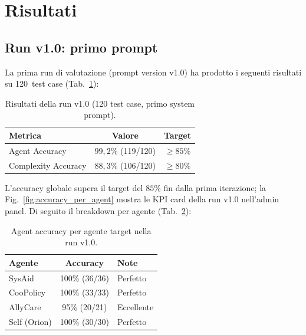 \section{Risultati}
\label{sec:eval-risultati}

\subsection{Run v1.0: primo prompt}
\label{subsec:eval-v10}

La prima run di valutazione (prompt version v1.0) ha prodotto i seguenti risultati su 120~test case (Tab.~\ref{tab:eval-v10}):

\begin{table}[htbp]
  \centering
  \caption[Risultati della run v1.0]{Risultati della run v1.0 (120 test case, primo system prompt).}
  \label{tab:eval-v10}
  \begin{tabular}{lcc}
    \toprule
    \textbf{Metrica}             & \textbf{Valore}  & \textbf{Target} \\
    \midrule
    Agent Accuracy               & $99{,}2\%$ (119/120) & $\geq 85\%$ \\
    Complexity Accuracy          & $88{,}3\%$ (106/120) & $\geq 80\%$ \\
    \bottomrule
  \end{tabular}
\end{table}

L'accuracy globale supera il target del $85\%$ fin dalla prima iterazione; la Fig.~\ref{fig:accuracy_per_agent} mostra le KPI card della run v1.0 nell'admin panel. Di seguito il breakdown per agente (Tab.~\ref{tab:eval-v10-breakdown}):

\begin{table}[htbp]
  \centering
  \caption[Breakdown per agente --- v1.0]{Agent accuracy per agente target nella run v1.0.}
  \label{tab:eval-v10-breakdown}
  \begin{tabular}{lcl}
    \toprule
    \textbf{Agente}   & \textbf{Accuracy}     & \textbf{Note} \\
    \midrule
    SysAid            & 100\% (36/36)         & Perfetto \\
    CooPolicy         & 100\% (33/33)         & Perfetto \\
    AllyCare          & 95\% (20/21)          & Eccellente \\
    Self (Orion)      & 100\% (30/30)         & Perfetto \\
    \bottomrule
  \end{tabular}
\end{table}

